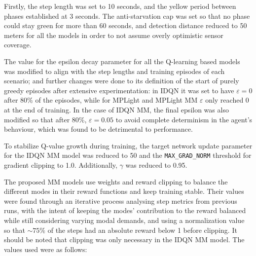 Firstly, the step length was set to 10 seconds, and the yellow period between phases established at 3 seconds. The anti-starvation cap was set so that no phase could stay green for more than 60 seconds, and detection distance reduced to 50 meters for all the models in order to not assume overly optimistic sensor coverage.

The value for the epsilon decay parameter for all the Q-learning based models was modified to align with the step lengths and training episodes of each scenario; and further changes were done to its definition of the start of purely greedy episodes after extensive experimentation: in IDQN it was set to have $\varepsilon=0$ after 80\% of the episodes, while for MPLight and MPLight MM $\varepsilon$ only reached 0 at the end of training. In the case of IDQN MM, the final epsilon was also modified so that after 80\%, $\varepsilon=0.05$ to avoid complete determinism in the agent's behaviour, which was found to be detrimental to performance.

To stabilize Q-value growth during training, the target network update parameter for the IDQN MM model was reduced to 50 and the \texttt{MAX\_GRAD\_NORM} threshold for gradient clipping to 1.0. Additionally, $\gamma$ was reduced to 0.95.

\medskip

\noindent The proposed MM models use weights and reward clipping to balance the different modes in their reward functions and keep training stable. Their values were found through an iterative process analysing step metrics from previous runs, with the intent of keeping the modes' contribution to the reward balanced while still considering varying modal demands, and using a normalization value so that $\sim75\%$ of the steps had an absolute reward below 1 before clipping. It should be noted that clipping was only necessary in the IDQN MM model. The values used were as follows:

